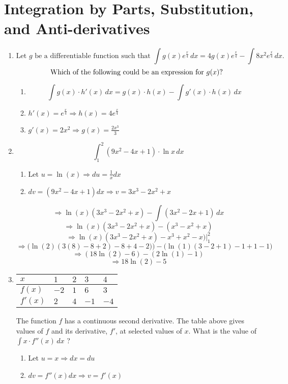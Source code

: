 \documentclass[12pt]{article}
\begin{document}
\section{Integration by Parts, Substitution, and Anti-derivatives}
\begin{enumerate}
    \item $$\text{Let $g$ be a differentiable function such that } \int g(x)e^{\frac{x}{4}} \, dx = 4g(x)e^{\frac{x}{4}}-\int 8x^2e^{\frac{x}{4}} \, dx.$$ $$\\ \text{Which of the following could be an expression for $g(x)$? } $$
\begin{enumerate}
    \item $$\int g(x) \cdot h'(x) \, dx = g(x) \cdot h(x)-\int g'(x)\cdot h(x) \,dx$$
    \item $h'(x)=e^{\frac{x}{4}} \Longrightarrow h(x)=4e^{\frac{x}{4}}$
    \item $g'(x)=2x^2 \Longrightarrow g(x) = \frac{2x^3}{3}$
\end{enumerate}
    \item $$\int_{1}^{2}(9x^2-4x+1) \cdot \ln x \, dx$$
\begin{enumerate}
    \item Let $u=\ln(x) \Longrightarrow du=\frac{1}{x} dx$ 
    \item $dv=(9x^2-4x+1) dx \Longrightarrow  v= 3x^3 -2x^2+x$
\end{enumerate}
$$\Longrightarrow \ln(x)(3x^3-2x^2+x)-\int (3x^2-2x+1) \, dx$$
$$\Longrightarrow \ln(x)(3x^3-2x^2+x)-(x^3-x^2+x)$$
$$\Longrightarrow \ln(x)(3x^3-2x^2+x)-x^3+x^2-x) \bigg\rvert^{2}_{1}$$
$$\Longrightarrow \bigg(\ln(2)(3(8)-8+2)-8+4-2) \bigg) - \bigg(\ln(1)(3-2+1)-1+1-1 \bigg)$$
$$\Longrightarrow (18\ln(2)-6)  -(2\ln(1)-1)$$
$$\Longrightarrow 18\ln(2)-5$$
\item 
\begin{table}[h]
\begin{centering}

\begin{tabular}{lllll}
$x$ & $1$ & $2$ & $3$ & $4$ \\ \hline
\multicolumn{1}{l|}{$f(x)$} & $-2$ & $1$ & $6$ & $3$ \\
\multicolumn{1}{l|}{$f'(x)$} & $2$ & $4$ & $-1$ & $-4$
\end{tabular}

\end{centering}
\end{table}
The function $f$ has a continuous second derivative. The table above gives values of $f$ and its derivative, $f'$, at selected values of $x$. What is the value of $\int x \cdot f''(x) \, dx$ ?
\begin{enumerate}
    \item Let $u=x \Longrightarrow dx=du$
    \item $dv=f''(x) dx \Longrightarrow v=f'(x)$
\end{enumerate}


\end{enumerate}
\end{document}
